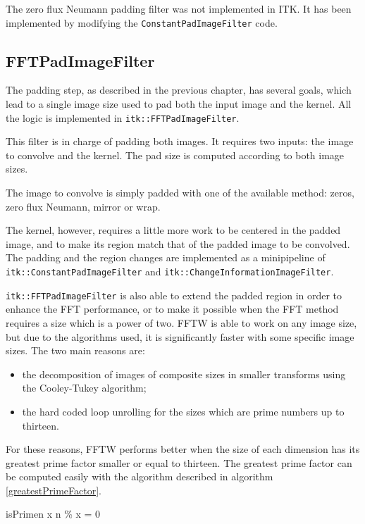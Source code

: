 \documentclass{InsightArticle}
\begin{document}
The zero flux Neumann padding filter was not implemented in ITK. It has been implemented by modifying
the \verb$ConstantPadImageFilter$ code.

\subsection{FFTPadImageFilter}

The padding step, as described in the previous chapter, has several goals, which lead to a single
image size used to pad both the input image and the kernel.
All the logic is implemented in \verb$itk::FFTPadImageFilter$.

This filter is in charge of padding both images. It requires two inputs: the image to convolve and
the kernel. The pad size is computed according to both image sizes.

The image to convolve is simply padded with one of the available method: zeros, zero flux Neumann, mirror
or wrap.

The kernel, however, requires a little more work to be
centered in the padded image, and to make its region match that of the padded image to be convolved.
The padding and the region changes are implemented as a minipipeline of \verb$itk::ConstantPadImageFilter$ and
\verb$itk::ChangeInformationImageFilter$.

\verb$itk::FFTPadImageFilter$ is also able to extend the padded region in order to enhance the FFT
performance, or to make it possible when the FFT method requires a size which is a power of
two. FFTW is able to work on any image size, but due to the algorithms used, it is significantly faster
with some specific image sizes. The two main reasons are:
\begin{itemize}
  \item the decomposition of images of composite sizes in smaller transforms using the
  Cooley-Tukey algorithm;
  \item the hard coded loop unrolling for the sizes which are prime numbers up to thirteen.
\end{itemize}
For these reasons, FFTW performs better when the size of each dimension has its greatest prime
factor smaller or equal to thirteen.
The greatest prime factor can be computed easily with the algorithm described in algorithm \ref{greatestPrimeFactor}.

\begin{pseudocode}{isPrime}{n}
\FOREACH x \in [2, \sqrt{n}] \DO 
\BEGIN
  \IF n \% x = 0 \THEN \RETURN \FALSE \\
\END \\
\RETURN \TRUE
\end{pseudocode}
\end{document}
